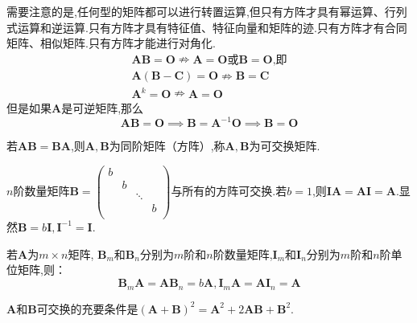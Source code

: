 需要注意的是,任何型的矩阵都可以进行转置运算,但只有方阵才具有幂运算、行列式运算和逆运算.只有方阵才具有特征值、特征向量和矩阵的迹.只有方阵才有合同矩阵、相似矩阵.只有方阵才能进行对角化.
\begin{gather*}
    \mathbf{A} \mathbf{B} =\mathbf{O}\nRightarrow\mathbf{A} =\mathbf{O} \text{或} \mathbf{B} =\mathbf{O} \text{,即} \\
    \mathbf{A} (\mathbf{B} -\mathbf{C})=\mathbf{O} \nRightarrow \mathbf{B} =\mathbf{C}\\
    \mathbf{A}^k =\mathbf{O}\nRightarrow\mathbf{A} =\mathbf{O}
\end{gather*}
但是如果$\mathbf{A}$是可逆矩阵,那么
\begin{equation*}
    \mathbf{A} \mathbf{B} =\mathbf{O} \implies \mathbf{B} =\mathbf{A}^{-1} \mathbf{O}\implies \mathbf{B} =\mathbf{O}
\end{equation*}
\begin{definition}
    若$\mathbf{A} \mathbf{B} =\mathbf{B} \mathbf{A} $,则$\mathbf{A} ,\mathbf{B} $为同阶矩阵（方阵）,称$\mathbf{A} ,\mathbf{B} $为可交换矩阵.
\end{definition}
\begin{ttheorem}
    $n$阶数量矩阵$\mathbf{B} =\begin{pmatrix}
    b   &      &      &      \\
       &   b   &      &      \\
       &      &   \ddots   &      \\
       &      &      &   b   \\
    \end{pmatrix}$与所有的方阵可交换.若$b=1$,则$\mathbf{I} \mathbf{A} =\mathbf{A} \mathbf{I} =\mathbf{A} .$显然$\mathbf{B} =b\mathbf{I} ,\mathbf{I}^{-1}=\mathbf{I}$.
\end{ttheorem}
\begin{ttheorem}
    若$\mathbf{A} $为$m\times n$矩阵, $\mathbf{B} _m$和$\mathbf{B} _n$分别为$m$阶和$n$阶数量矩阵,$\mathbf{I} _m$和$\mathbf{I} _n$分别为$m$阶和$n$阶单位矩阵,则：
    \begin{equation*}
        \mathbf{B} _m\mathbf{A} =\mathbf{A}\mathbf{B} _n =b\mathbf{A} ,\mathbf{I} _m\mathbf{A} =\mathbf{A} \mathbf{I} _n=\mathbf{A} 
    \end{equation*}
\end{ttheorem}
\begin{ttheorem}
    $\mathbf{A}$和$\mathbf{B}$可交换的充要条件是$(\mathbf{A}+\mathbf{B})^2=\mathbf{A}^2+2\mathbf{A}\mathbf{B}+\mathbf{B}^2.$
\end{ttheorem}
